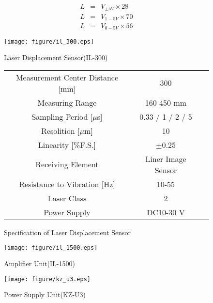\documentclass[a4paper,12pt]{article_vdlab_sotsuron}
\begin{document}
\begin{eqnarray}
 \label{eq:v5} L &=& V_{\pm5V} \times 28\\
 \label{eq:v15} L &=& V_{1-5V} \times 70\\
 \label{eq:v05} L &=& V_{0-5V} \times 56
\end{eqnarray}

\vspace*{10mm}
\begin{figure}[htp]
  \begin{minipage}{0.3\textwidth}
    \begin{center}
      \texttt{[image: figure/il\_300.eps]}
      \vspace*{3mm}
      \caption{Laser Displacement Sensor(IL-300)}
      \label{fig:il_300}
    \end{center}
  \end{minipage}
  \begin{minipage}{0.7\textwidth}
      \begin{center}
	\makeatletter
	\def\@captype{table}   
	\makeatother
	\caption{Specification of Laser Displacement Sensor}
	\label{tab:il_300}
	\begin{tabular}{ccc}\hline
	  Measurement Center Distance [mm] & 300\\
	  Measuring Range & 160-450 mm\\
	  Sampling Period [$\mu$s]& 0.33 / 1 / 2 / 5\\
	  Resolition [$\mu$m] & 10\\
	  Linearity [\%F.S.] & $\pm$0.25\\
	  Receiving Element & Liner Image Sensor\\
	  Resistance to Vibration [Hz] & 10-55\\
	  Laser Class & 2\\
	  Power Supply & DC10-30 V\\\hline 
	  \end{tabular}  
	\end{center}
  \end{minipage}
\end{figure}

\vspace*{10mm}
\begin{figure}[htp]
  \begin{minipage}{0.5\textwidth}
    \begin{center}
      \texttt{[image: figure/il\_1500.eps]}
      \vspace*{3mm}
      \caption{Amplifier Unit(IL-1500)}
      \label{fig:il_1500} 
    \end{center}
  \end{minipage}
  \begin{minipage}{0.5\textwidth}
    \begin{center}
      \texttt{[image: figure/kz\_u3.eps]}
      \vspace*{3mm}
      \caption{Power Supply Unit(KZ-U3)}
      \label{fig:kz_u3}  
    \end{center}
  \end{minipage}
\end{figure}
\end{document}

